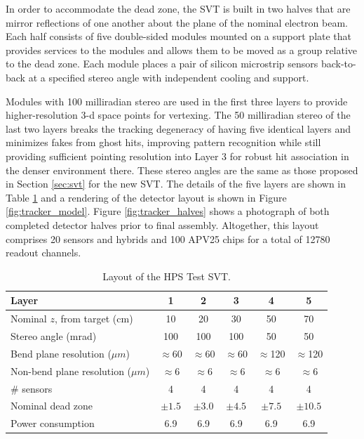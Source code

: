 In order to accommodate the dead zone, the SVT is built in two halves that are mirror reflections of one another about the plane of the nominal electron beam.  Each half consists of five double-sided modules mounted on a support plate that provides services to the modules and allows them to be moved as a group relative to the dead zone. Each module places a pair of silicon microstrip sensors back-to-back at a specified stereo angle with independent cooling and support.

Modules with 100 milliradian stereo are used in the first three layers to provide higher-resolution 3-d space points for vertexing. The 50 milliradian stereo of the last two layers breaks the tracking degeneracy of having five identical layers and minimizes fakes from ghost hits, improving pattern recognition while still providing sufficient pointing resolution into Layer 3 for robust hit association in the denser environment there. These stereo angles are the same as those proposed in Section \ref{sec:svt} for the new SVT. The details of the five layers are shown in Table \ref{tab:trk} and a rendering of the detector layout is shown in Figure \ref{fig:tracker_model}.  Figure \ref{fig:tracker_halves} shows a photograph of both completed detector halves prior to final assembly.  Altogether, this layout comprises 20 sensors and hybrids and 100 APV25 chips for a total of 12780 readout channels. 

\begin{table}[h]
\begin{center}
\begin{tabular}{lccccc}   
\hline \hline 
    Layer & 1 & 2 & 3 & 4 & 5 \\      
\hline
    Nominal $z$, from target (cm)  & 10 & 20 & 30 & 50 & 70  \\ 
    Stereo angle (mrad)  & 100 & 100 & 100 & 50 & 50 \\ 
    Bend plane resolution ($\mu m$)  & $\approx$60 & $\approx$60 & $\approx$60 & $\approx$120 & $\approx$120  \\ 
    Non-bend plane resolution ($\mu m$)  & $\approx$6 & $\approx$6 & $\approx$6 & $\approx$6 & $\approx$6  \\ 
    \# sensors  & 4 & 4 & 4 & 4 & 4  \\ 
    Nominal dead zone  & $\pm1.5$  & $\pm3.0$  & $\pm4.5$  & $\pm7.5$  & $\pm10.5$  \\ 
    Power consumption & 6.9 & 6.9 & 6.9 & 6.9 & 6.9 \\
\hline \hline
\end{tabular}
\caption[]{Layout of the HPS Test SVT. }
\label{tab:trk} 
\end{center}
\end{table}

